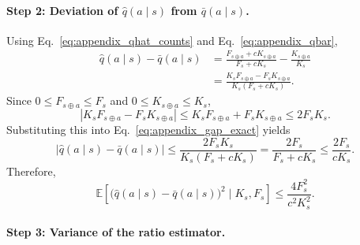 \documentclass{article}
\begin{document}
\paragraph{Step 2: Deviation of $\widehat q(a \mid s)$ from $\bar q(a \mid s)$.}
Using Eq.~\eqref{eq:appendix_qhat_counts} and Eq.~\eqref{eq:appendix_qbar},
\begin{align}
\widehat q(a \mid s)-\bar q(a \mid s)
&=
\frac{F_{s\oplus a}+cK_{s\oplus a}}{F_s+cK_s}
-
\frac{K_{s\oplus a}}{K_s}
\nonumber\\
&=
\frac{K_sF_{s\oplus a}-F_sK_{s\oplus a}}
{K_s(F_s+cK_s)}.
\label{eq:appendix_gap_exact}
\end{align}
Since $0\le F_{s\oplus a}\le F_s$ and $0\le K_{s\oplus a}\le K_s$,
\begin{equation}
\left|K_sF_{s\oplus a}-F_sK_{s\oplus a}\right|
\le
K_sF_{s\oplus a}+F_sK_{s\oplus a}
\le
2F_sK_s.
\end{equation}
Substituting this into Eq.~\eqref{eq:appendix_gap_exact} yields
\begin{equation}
\left|
\widehat q(a \mid s)-\bar q(a \mid s)
\right|
\le
\frac{2F_sK_s}{K_s(F_s+cK_s)}
=
\frac{2F_s}{F_s+cK_s}
\le
\frac{2F_s}{cK_s}.
\label{eq:appendix_qhat_qbar_gap}
\end{equation}
Therefore,
\begin{equation}
\mathbb{E}\!\left[
\bigl(\widehat q(a \mid s)-\bar q(a \mid s)\bigr)^2
\mid K_s,F_s
\right]
\le
\frac{4F_s^2}{c^2K_s^2}.
\label{eq:appendix_delta_second_moment}
\end{equation}

\paragraph{Step 3: Variance of the ratio estimator.}
\end{document}

